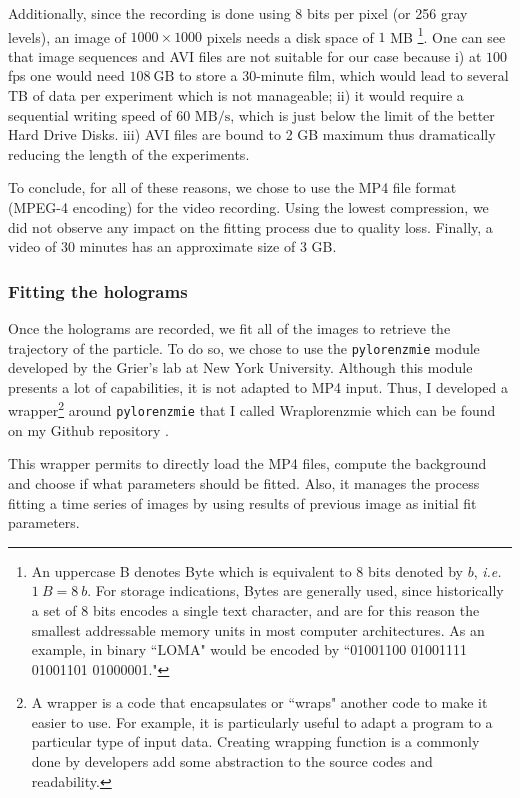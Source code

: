 Additionally, since the recording is done using 8 bits per pixel (or 256 gray levels), an image of $1000 \times 1000$ pixels needs a disk space of $1$ MB \footnote{An uppercase B denotes Byte which is equivalent to 8 bits denoted by $b$, \textit{i.e.} $1\mathrm ~ {B} = 8 ~ b$. For storage indications, Bytes are generally used, since historically a set of $8$ bits encodes a single text character, and are for this reason the smallest addressable memory units in most computer architectures. As an example, in binary ``LOMA" would be encoded by ``01001100 01001111 01001101 01000001."}. One can see that image sequences and AVI files are not suitable for our case because i) at $100$ \gls{fps} one would need $108 ~ \mathrm{GB}$ to store a 30-minute film, which would lead to several TB of data per experiment which is not manageable; ii) it would require a sequential writing speed of 60 $\mathrm{MB/s}$, which is just below the limit of the better Hard Drive Disks. iii) AVI files are bound to 2 GB maximum thus dramatically reducing the length of the experiments.

To conclude, for all of these reasons, we chose to use the MP4 file format (MPEG-4 encoding) for the video recording. Using the lowest compression, we did not observe any impact on the fitting process due to quality loss. Finally, a video of 30 minutes has an approximate size of 3 GB.


\subsubsection{Fitting the holograms}


Once the holograms are recorded, we fit all of the images to retrieve the trajectory of the particle. To do so, we chose to use the \texttt{pylorenzmie} module developed by the Grier's lab at New York University. Although this module presents a lot of capabilities, it is not adapted to MP4 input. Thus, I developed a wrapper\footnote{A wrapper is a code that encapsulates or ``wraps" another code to make it easier to use. For example, it is particularly useful to adapt a program to a particular type of input data. Creating wrapping function is a commonly done by developers add some abstraction to the source codes and readability. } around \texttt{pylorenzmie} that I called Wraplorenzmie which can be found on my Github repository \href{https://github.com/eXpensia/wraplorenzmie}{\faGithub}. 

This wrapper permits to directly load the MP4 files, compute the background and choose if what parameters should be fitted. Also, it manages the process fitting a time series of images by using results of previous image as initial fit parameters.

